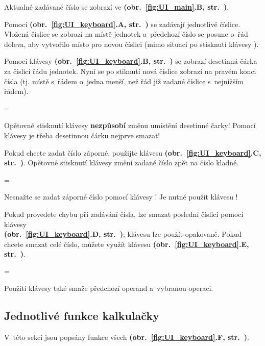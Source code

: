 \documentclass[a5paper,8pt,twoside]{extarticle}
\newenvironment{warningBox}
  {\par\begin{mdframed}[linewidth=1pt,linecolor=black]%
    \begin{list}{}{\leftmargin=1cm
                   \labelwidth=\leftmargin}\item[\Large\warning]}
  {\end{list}\end{mdframed}\par}
\newenvironment{prohibitBox}
  {\par\begin{mdframed}[linewidth=1pt,linecolor=black]%
    \begin{list}{}{\leftmargin=1cm
                   \labelwidth=\leftmargin}\item[\Large\noway]}
  {\end{list}\end{mdframed}\par}
\newcommand*\fref[2]{\textbf{(obr.~\ref{#1}#2, str.~\pageref{#1})}}
\begin{document}
    Aktualné zadávané číslo se zobrazí ve  \fref{fig:UI_main}{.B}.

    Pomocí  \fref{fig:UI_keyboard}{.A} se zadávají jednotlivé číslice. Vložená číslice se zobrazí na místě jednotek a~předchozí číslo se posune o~řád doleva, aby vytvořilo místo pro novou číslici (mimo situaci po stisknutí klávesy ).

    Pomocí klávesy  \fref{fig:UI_keyboard}{.B} se zobrazí desetinná čárka za číslicí řádu jednotek. Nyní se po stiknutí  nová číslice zobrazí na pravém konci čísla (tj. místě s~řádem o~jedna menší, než řád již zadané číslice s~nejnižším řádem).

    \begin{prohibitBox}
        Opětovné stisknutí klávesy  \textbf{nezpůsobí} změnu umístění desetinné čarky! Pomocí klávesy  je třeba desetinnou čá\-rku nejprve smazat!
    \end{prohibitBox}

    Pokud chcete zadat číslo záporné, použijte klávesu  \fref{fig:UI_keyboard}{.C}. Opětovné stisknutí klávesy změní zadané číslo zpět na číslo kladné.

    \begin{prohibitBox}
        Nesnažte se zadat záporné číslo pomocí klávesy ! Je nutné použít klávesu !
    \end{prohibitBox}

    Pokud provedete chybu při zadávání čísla, lze smazat poslední číslici pomocí klávesy \\ \fref{fig:UI_keyboard}{.D}; klávesu lze použít opakovaně. Pokud chcete smazat celé číslo, můžete využít klávesu  \fref{fig:UI_keyboard}{.E}.

    \begin{warningBox}
        Použítí klávesy  také smaže předchozí operand a~vybranou operaci.
    \end{warningBox}

    \renewcommand\thesubsubsection{\thesubsection.\arabic{subsubsection}}
    \subsection{Jednotlivé funkce kalkulačky}
    \label{sec:function_reference}
    V~této sekci jsou popsány funkce všech  \fref{fig:UI_keyboard}{.F}.
\end{document}
